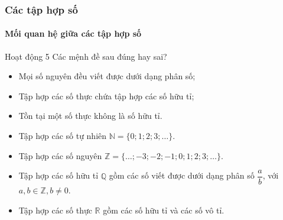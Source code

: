 \subsubsection{Các tập hợp số}
\begin{kienthuc}
	\paragraph{Mối quan hệ giữa các tập hợp số}
	\begin{hoatdong}{Hoạt động 5}
		Các mệnh đề sau đúng hay sai?
		\begin{itemize}
			\item[a)] Mọi số nguyên đều viết được dưới dạng phân số;
			\item[b)] Tập hợp các số thực chứa tập hợp các số hữu tỉ;
			\item[c)] Tồn tại một số thực không là số hữu tỉ.
		\end{itemize}
	\end{hoatdong}
	\begin{itemize}
		\item Tập hợp các số tự nhiên $\mathbb{N} = \{0; 1; 2; 3; \dots\}$.
		\item Tập hợp các số nguyên $\mathbb{Z} = \{\dots; -3; -2; -1; 0; 1; 2; 3; \dots\}$.
		\item Tập hợp các số hữu tỉ $\mathbb{Q}$ gồm các số viết được dưới dạng phân số $\dfrac{a}{b}$, với $a, b \in \mathbb{Z}, b \neq 0$.
		\item Tập hợp các số thực $\mathbb{R}$ gồm các số hữu tỉ và các số vô tỉ.
	\end{itemize}


\end{kienthuc}
